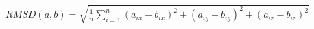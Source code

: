 $RMSD(a,b) = \sqrt{\frac{1}{n} \sum_{i=1}^{n} (a_{ix}-b_{ix})^2 + (a_{iy}-b_{iy})^2 + (a_{iz}-b_{iz})^2}$